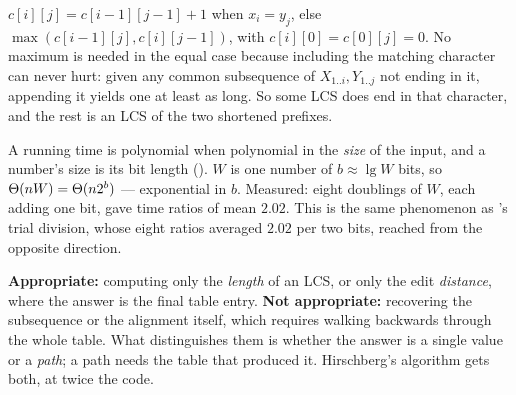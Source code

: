 \begin{ans}
  \item $c[i][j] = c[i-1][j-1]+1$ when $x_{i} = y_{j}$, else
        $\max(c[i-1][j], c[i][j-1])$, with $c[i][0] = c[0][j] = 0$. No maximum
        is needed in the equal case because including the matching character
        can never hurt: given any common subsequence of $X_{1..i}, Y_{1..j}$ not
        ending in it, appending it yields one at least as long. So some LCS
        does end in that character, and the rest is an LCS of the two shortened
        prefixes.
  \item A running time is polynomial when polynomial in the \emph{size} of the
        input, and a number's size is its bit length (). $W$ is
        one number of $b \approx \lg W$ bits, so $\Theta(nW) =
        \Theta(n2^{b})$ --- exponential in $b$. Measured: eight doublings of
        $W$, each adding one bit, gave time ratios of mean $2.02$. This is the
        same phenomenon as 's trial division, whose eight ratios
        averaged $2.02$ per two bits, reached from the opposite direction.
  \item \textbf{Appropriate:} computing only the \emph{length} of an LCS, or
        only the edit \emph{distance}, where the answer is the final table
        entry. \textbf{Not appropriate:} recovering the subsequence or the
        alignment itself, which requires walking backwards through the whole
        table. What distinguishes them is whether the answer is a single value
        or a \emph{path}; a path needs the table that produced it. Hirschberg's
        algorithm gets both, at twice the code.
\end{ans}

